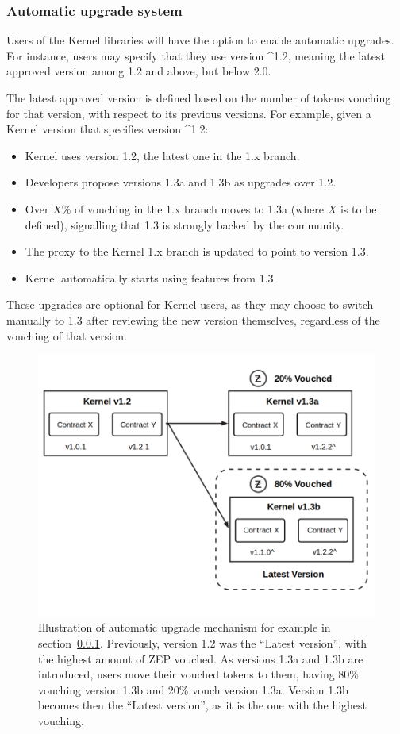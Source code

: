 \documentclass[]{article}
\makeatletter
\DeclareRobustCommand{\_}{%
  \leavevmode\vbox{%
    \hrule\@width.5em
          \@height-.26ex
          \@depth\dimexpr.26ex+.28pt\relax}}
\makeatother
\begin{document}
\subsubsection{Automatic upgrade system}
\label{autoupgrade}

Users of the Kernel libraries will have the option to enable automatic
upgrades. For instance, users may specify that they use version \^{}1.2,
meaning the latest approved version among 1.2 and above, but below
2.0.

The latest approved version is defined based on the number of
tokens vouching for that version, with respect to its previous versions.
For example, given a Kernel version that specifies version \^{}1.2:

\begin{itemize}
  \item
    Kernel uses version 1.2, the latest one in the 1.x branch.
  \item
    Developers propose versions 1.3a and 1.3b as upgrades over 1.2.
  \item
    Over $X\%$ of vouching in the 1.x branch moves to 1.3a (where $X$ is to
    be defined), signalling that 1.3 is strongly backed by the community.
  \item
    The proxy to the Kernel 1.x branch is updated to point to version 1.3.
  \item
    Kernel automatically starts using features from 1.3.
\end{itemize}

These upgrades are optional for Kernel users, as they may choose to
switch manually to 1.3 after reviewing the new version themselves,
regardless of the vouching of that version.

\pagebreak

\begin{figure}
  \centering
  \includegraphics[width=0.75\linewidth]{images/image1}
  \caption{
Illustration of automatic upgrade mechanism for example in section~\ref{autoupgrade}.
  Previously, version 1.2 was the ``Latest version'', with the highest amount of ZEP
vouched. As versions 1.3a and 1.3b are introduced, users move their vouched tokens
to them, having 80\% vouching version 1.3b and 20\% vouch version 1.3a. Version 1.3b
becomes then the ``Latest version'', as it is the one with the highest vouching.
}
\end{figure}
\end{document}
